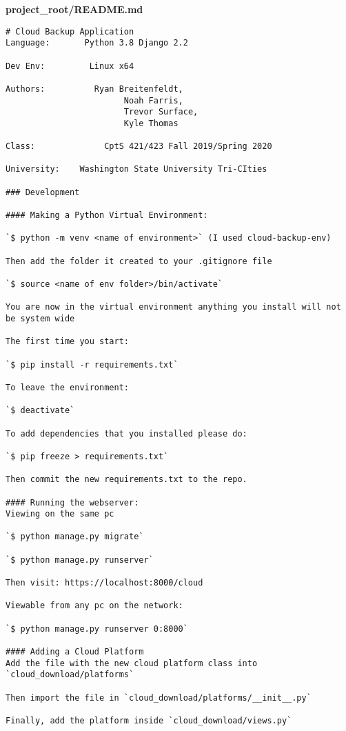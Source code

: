 \documentclass{article}
\begin{document}
\newpage
\textbf{project\_root/README.md}
\begin{verbatim}
# Cloud Backup Application
Language:       Python 3.8 Django 2.2

Dev Env:         Linux x64

Authors:          Ryan Breitenfeldt,
                        Noah Farris,
                        Trevor Surface,
                        Kyle Thomas
                        
Class:              CptS 421/423 Fall 2019/Spring 2020

University:    Washington State University Tri-CIties

### Development

#### Making a Python Virtual Environment:

`$ python -m venv <name of environment>` (I used cloud-backup-env)

Then add the folder it created to your .gitignore file

`$ source <name of env folder>/bin/activate`

You are now in the virtual environment anything you install will not be system wide

The first time you start:

`$ pip install -r requirements.txt`

To leave the environment:

`$ deactivate`

To add dependencies that you installed please do:

`$ pip freeze > requirements.txt`

Then commit the new requirements.txt to the repo.

#### Running the webserver:
Viewing on the same pc

`$ python manage.py migrate`

`$ python manage.py runserver`

Then visit: https://localhost:8000/cloud

Viewable from any pc on the network:

`$ python manage.py runserver 0:8000`

#### Adding a Cloud Platform
Add the file with the new cloud platform class into `cloud_download/platforms`

Then import the file in `cloud_download/platforms/__init__.py`

Finally, add the platform inside `cloud_download/views.py`
\end{verbatim}
\end{document}
